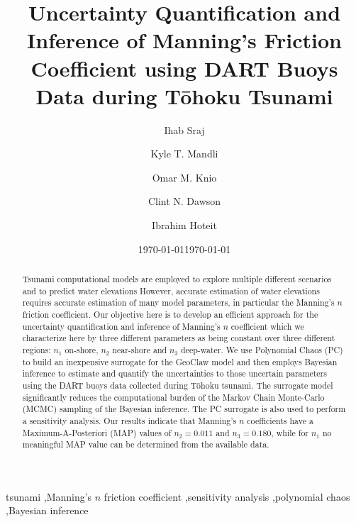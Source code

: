 \documentclass[preprint,12pt]{elsarticle}
\newcommand{\geoclaw}{{\sc GeoClaw}\xspace}
\newcommand{\tohoku}{T\={o}hoku\xspace}
\begin{document}
\ifpdf
{}
\else
{}
\fi

\begin{frontmatter}

\title{Uncertainty Quantification and Inference of Manning's Friction Coefficient using DART Buoys Data during
\tohoku Tsunami}
\date{\today}

\author[kaust]{Ihab Sraj}
\author[ut]{Kyle T. Mandli}
\author[duke]{Omar M. Knio}
\author[ut]{Clint N. Dawson}
\author[kaust]{Ibrahim Hoteit}
\address[kaust]{Department of Physical Sciences and Engineering, King Abdullah University for Science and Technology, Thuwal, Saudi Arabia}
\address[ut]{Institute for Computational Engineering and Science, University of Texas at Austin, 201 E 24th ST. Stop C0200, Austin, TX 78712-1229, USA}
\address[duke]{Department of Mechanical Engineering and Materials Science, Duke University, 144
Hudson Hall, Durham, North Carolina 27708, USA}
\date{\today}

\begin{abstract}

Tsunami computational models are employed to explore multiple 
different scenarios and to predict water elevations 
However, accurate estimation of water elevations 
requires accurate estimation of many model parameters,
in particular the Manning's $n$ friction coefficient. 
Our objective here is to develop an efficient approach for the 
uncertainty quantification and inference of Manning's $n$ coefficient 
which we characterize here by three different parameters 
as being constant over three different regions: $n_1$ on-shore, $n_2$ near-shore and $n_3$ deep-water. 
We use Polynomial Chaos (PC) to build an inexpensive surrogate for the 
\geoclaw model and then employs Bayesian inference to estimate 
and quantify the uncertainties to those uncertain parameters
using the DART buoys data collected during \tohoku tsunami. 
The surrogate model significantly reduces the computational burden of the Markov Chain Monte-Carlo (MCMC) 
sampling of the Bayesian inference. The PC surrogate is also used to perform a sensitivity analysis. 
Our results indicate that Manning's $n$ coefficients have a Maximum-A-Posteriori (MAP) values of $n_2=0.011$ and $n_3=0.180$, while for $n_1$ no meaningful MAP value can be determined from the available data. 


\end{abstract}

\begin{keyword}
tsunami \sep Manning's $n$ friction coefficient \sep sensitivity analysis \sep polynomial chaos \sep Bayesian inference
\end{keyword}

\end{frontmatter}
\end{document}
